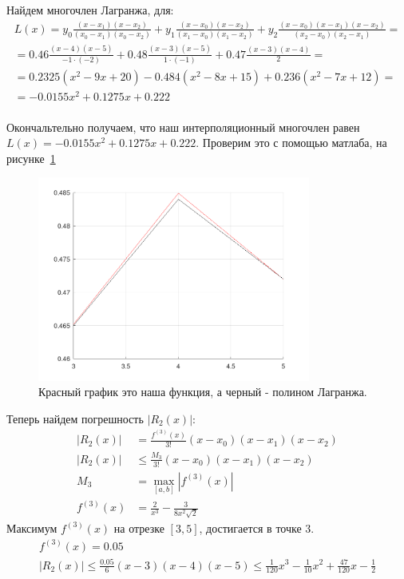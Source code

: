 Найдем многочлен Лагранжа, для:
\begin{multline*}
  L(x) = y_{0} \frac{(x - x_{1})(x - x_{2})}{(x_{0} - x_{1})(x_{0} - x_{2})} + y_{1} \frac{(x - x_{0})(x - x_{2})}{(x_{1} - x_{0})(x_{1} - x_{2})} + y_{2} \frac{(x - x_{0})(x - x_{1})(x - x_{2})}{(x_{2} - x_{0})(x_{2} - x_{1})} = \\[3mm]
  = 0.46 \frac{(x - 4)(x - 5)}{-1 \cdot (-2)} + 0.48 \frac{(x - 3)(x-5)}{1 \cdot (-1)} + 0.47 \frac{(x - 3)(x-4)}{2} = \\[3mm]
  = 0.2325(x^{2}-9x+20) - 0.484(x^{2}-8x+15) + 0.236(x^{2}-7x+12) = \\[3mm]
  = -0.0155x^{2} + 0.1275x + 0.222
\end{multline*}\\[2mm]
Окончальтельно получаем, что наш интерполяционный многочлен равен $L(x) = -0.0155x^{2} + 0.1275x + 0.222$. Проверим это с помощью матлаба, на рисунке~\ref{fig:plot_5}

\begin{figure}
  \caption{Красный график это наша функция, а черный - полином Лагранжа.}
  \label{fig:plot_5}
  \centering
  \includegraphics[width=0.8\textwidth]{images/task_5.png}
\end{figure}

Теперь найдем погрешность $|R_{2}(x)|$:\\[2mm]
\begin{align*}
  |R_{2}(x)| &= \frac{f^{(3)}(x)}{3!}(x-x_{0})(x-x_{1})(x-x_{2}) \\[1mm]
  |R_{2}(x)| & \leq \frac{M_{3}}{3!}(x-x_{0})(x-x_{1})(x-x_{2}) \\[1mm]
  M_{3} &= \max_{\left[a, b\right]}|f^{(3)}(x)| \\[1mm]
  f^{(3)}(x) & = \frac{2}{x^{3}} - \frac{3}{8x^{2}\sqrt{2}}
\end{align*}
Максимум $f^{(3)}(x)$ на отрезке $[3, 5]$, достигается в точке $3$.
\begin{gather*}
  f^{(3)}(x) = 0.05 \\[1mm]
  |R_{2}(x)| \leq \frac{0.05}{6}(x-3)(x-4)(x-5) \leq \frac{1}{120}x^{3} - \frac{1}{10}x^{2} + \frac{47}{120}x - \frac{1}{2}
\end{gather*}

